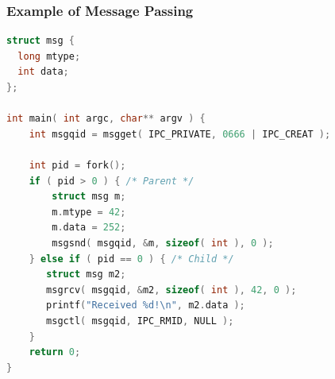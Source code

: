 \begin{frame}[fragile]
\frametitle{Example of Message Passing}

\begin{lstlisting}[language=C]
struct msg {
  long mtype;
  int data;
};

int main( int argc, char** argv ) { 
    int msgqid = msgget( IPC_PRIVATE, 0666 | IPC_CREAT );

    int pid = fork();
    if ( pid > 0 ) { /* Parent */
        struct msg m;
        m.mtype = 42; 
        m.data = 252;
        msgsnd( msgqid, &m, sizeof( int ), 0 );
    } else if ( pid == 0 ) { /* Child */
       struct msg m2; 
       msgrcv( msgqid, &m2, sizeof( int ), 42, 0 );
       printf("Received %d!\n", m2.data );
       msgctl( msgqid, IPC_RMID, NULL );
    }   
    return 0;
}
\end{lstlisting}


\end{frame}







